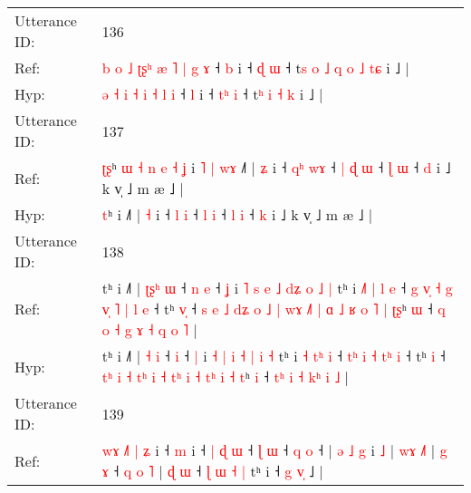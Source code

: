 \documentclass[10pt]{article}
\DeclareRobustCommand{\hl}[1]{{\textcolor{red}{#1}}}
\begin{document}
\begin{longtable}{ll}
\midrule
Utterance ID: & 136 \\
Ref: & \hl{b}\hl{ }\hl{o} \hl{˩} \hl{ʈ}\hl{ʂ}\hl{ʰ} \hl{æ} \hl{˥} \hl{|} \hl{g} \hl{ɤ} ˧ \hl{b} i ˧ \hl{}\hl{ɖ} \hl{ɯ} ˧ t\hl{s}\hl{ }\hl{o}\hl{ }\hl{˩}\hl{ }\hl{q} \hl{o} \hl{˩} \hl{t}\hl{ɕ} i ˩ |
 \\
Hyp: & \hl{}\hl{}\hl{ə} \hl{˧} \hl{}\hl{}\hl{i} \hl{˧} \hl{i} \hl{˧} \hl{l} \hl{i} ˧ \hl{l} i ˧ \hl{t}\hl{ʰ} \hl{i} ˧ t\hl{}\hl{}\hl{}\hl{}\hl{}\hl{}\hl{ʰ} \hl{i} \hl{˧} \hl{}\hl{k} i ˩ |
 \\
\midrule
Utterance ID: & 137 \\
Ref: & \hl{ʈ}\hl{ʂ}ʰ\hl{ }\hl{ɯ}\hl{ }\hl{˧}\hl{ }\hl{n}\hl{ }\hl{e}\hl{ }\hl{˧}\hl{ }\hl{ʝ} i\hl{ }\hl{˥}\hl{ }\hl{|}\hl{ }\hl{w}\hl{ɤ} ˩˥ | \hl{ʑ} i ˧ \hl{q}\hl{ʰ} \hl{w}\hl{ɤ} ˧\hl{ }\hl{|} \hl{ɖ} \hl{ɯ} ˧ \hl{ɭ} \hl{ɯ} ˧ \hl{d} i ˩ k v̩ ˩ m æ ˩ |
 \\
Hyp: & \hl{}\hl{t}ʰ\hl{}\hl{}\hl{}\hl{}\hl{}\hl{}\hl{}\hl{}\hl{}\hl{}\hl{}\hl{} i\hl{}\hl{}\hl{}\hl{}\hl{}\hl{}\hl{} ˩˥ | \hl{˧} i ˧ \hl{}\hl{l} \hl{}\hl{i} ˧\hl{}\hl{} \hl{l} \hl{i} ˧ \hl{l} \hl{i} ˧ \hl{k} i ˩ k v̩ ˩ m æ ˩ |
 \\
\midrule
Utterance ID: & 138 \\
Ref: & tʰ i ˩˥ | \hl{ʈ}\hl{ʂ}\hl{ʰ} \hl{ɯ} ˧\hl{ }\hl{n} \hl{e} ˧ \hl{ʝ} i\hl{ }\hl{˥} \hl{s} \hl{e} \hl{˩} \hl{d}\hl{ʑ} \hl{o} \hl{˩} \hl{|} tʰ i \hl{˩}\hl{˥} \hl{|}\hl{ }\hl{l} \hl{e} ˧\hl{ }\hl{g}\hl{ }\hl{v}\hl{̩} \hl{˧}\hl{ }\hl{g} \hl{v}\hl{̩} \hl{˥} \hl{|}\hl{ }\hl{l} \hl{e} ˧ tʰ \hl{v}\hl{̩} ˧ \hl{s}\hl{ }\hl{e} \hl{˩} \hl{d}\hl{ʑ} \hl{o}\hl{ }\hl{˩} \hl{|} \hl{w}\hl{ɤ} \hl{˩}\hl{˥}\hl{ }\hl{|} \hl{ɑ} \hl{˩} \hl{ʁ}\hl{ }\hl{o} \hl{˥} \hl{|} \hl{ʈ}\hl{ʂ}ʰ \hl{ɯ} ˧\hl{ }\hl{q} \hl{o}\hl{ }\hl{˧} \hl{g} \hl{ɤ} \hl{˧}\hl{ }\hl{q} \hl{o} \hl{˥} |
 \\
Hyp: & tʰ i ˩˥ | \hl{}\hl{}\hl{˧} \hl{i} ˧\hl{}\hl{} \hl{i} ˧ \hl{|} i\hl{}\hl{} \hl{˧} \hl{|} \hl{i} \hl{}\hl{˧} \hl{|} \hl{i} \hl{˧} tʰ i \hl{}\hl{˧} \hl{}\hl{t}\hl{ʰ} \hl{i} ˧\hl{}\hl{}\hl{}\hl{}\hl{} \hl{}\hl{t}\hl{ʰ} \hl{}\hl{i} \hl{˧} \hl{}\hl{t}\hl{ʰ} \hl{i} ˧ tʰ \hl{}\hl{i} ˧ \hl{}\hl{t}\hl{ʰ} \hl{i} \hl{}\hl{˧} \hl{}\hl{t}\hl{ʰ} \hl{i} \hl{}\hl{˧} \hl{}\hl{}\hl{t}\hl{ʰ} \hl{i} \hl{˧} \hl{}\hl{t}\hl{ʰ} \hl{i} \hl{˧} \hl{}\hl{t}ʰ \hl{i} ˧\hl{}\hl{} \hl{}\hl{t}\hl{ʰ} \hl{i} \hl{˧} \hl{}\hl{k}\hl{ʰ} \hl{i} \hl{˩} |
 \\
\midrule
Utterance ID: & 139 \\
Ref: & \hl{w}\hl{ɤ}\hl{ }\hl{˩}\hl{˥}\hl{ }\hl{|}\hl{ }\hl{ʑ} i ˧\hl{ }\hl{m} i ˧\hl{ }\hl{|}\hl{ }\hl{ɖ} \hl{ɯ} ˧ \hl{ɭ} \hl{ɯ} ˧ \hl{q} \hl{o} ˧ |\hl{ }\hl{ə}\hl{ }\hl{˩}\hl{ }\hl{g} i \hl{˩} | \hl{w}\hl{ɤ} \hl{˩}\hl{˥} |\hl{ }\hl{g} \hl{ɤ} ˧\hl{ }\hl{q}\hl{ }\hl{o}\hl{ }\hl{˥} |\hl{ }\hl{ɖ} \hl{ɯ} ˧ \hl{ɭ}\hl{ }\hl{ɯ} \hl{˧} \hl{|} tʰ i ˧ \hl{g}\hl{ }\hl{v}\hl{̩} ˩ |

\end{longtable}
\end{document}
